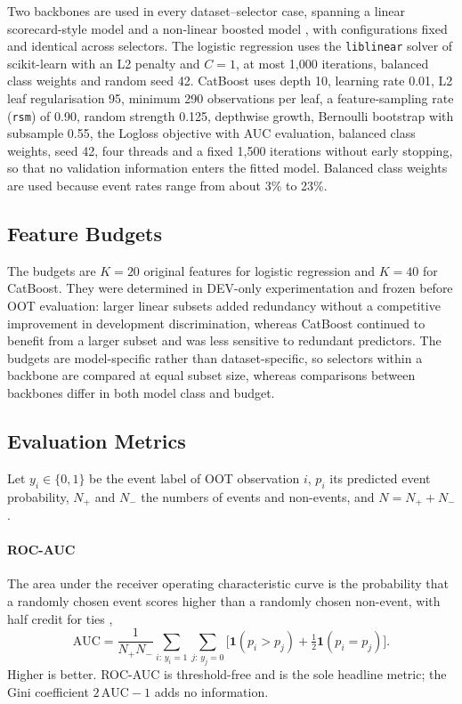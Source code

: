 \documentclass[final,5p,twocolumn]{elsarticle}
\newcommand{\Kfeat}{K}
\newcommand{\AUC}{\mathrm{AUC}}
\begin{document}
Two backbones are used in every dataset--selector case, spanning a linear scorecard-style model and a non-linear boosted model \cite{lessmann2015,gunnarsson2021}, with configurations fixed and identical across selectors. The logistic regression uses the \texttt{liblinear} solver of scikit-learn \cite{pedregosa2011} with an L2 penalty and $C=1$, at most 1,000 iterations, balanced class weights and random seed 42. CatBoost \cite{prokhorenkova2018} uses depth 10, learning rate 0.01, L2 leaf regularisation 95, minimum 290 observations per leaf, a feature-sampling rate (\texttt{rsm}) of 0.90, random strength 0.125, depthwise growth, Bernoulli bootstrap with subsample 0.55, the Logloss objective with AUC evaluation, balanced class weights, seed 42, four threads and a fixed 1,500 iterations without early stopping, so that no validation information enters the fitted model. Balanced class weights are used because event rates range from about 3\% to 23\%.

\subsection{Feature Budgets}
\label{subsec:feature_budgets}

The budgets are $\Kfeat=20$ original features for logistic regression and $\Kfeat=40$ for CatBoost. They were determined in DEV-only experimentation and frozen before OOT evaluation: larger linear subsets added redundancy without a competitive improvement in development discrimination, whereas CatBoost continued to benefit from a larger subset and was less sensitive to redundant predictors. The budgets are model-specific rather than dataset-specific, so selectors within a backbone are compared at equal subset size, whereas comparisons between backbones differ in both model class and budget.

\subsection{Evaluation Metrics}
\label{subsec:metrics}

Let $y_i\in\{0,1\}$ be the event label of OOT observation $i$, $p_i$ its predicted event probability, $N_+$ and $N_-$ the numbers of events and non-events, and $N=N_++N_-$.

\paragraph{ROC-AUC}
The area under the receiver operating characteristic curve is the probability that a randomly chosen event scores higher than a randomly chosen non-event, with half credit for ties \cite{hanley1982},
\begin{equation}
    \AUC=\frac{1}{N_+N_-}\sum_{i:\,y_i=1}\sum_{j:\,y_j=0}\big[\mathbf{1}(p_i>p_j)+\tfrac12\mathbf{1}(p_i=p_j)\big].
    \label{eq:roc_auc}
\end{equation}
Higher is better. ROC-AUC is threshold-free and is the sole headline metric; the Gini coefficient $2\,\AUC-1$ adds no information.
\end{document}
